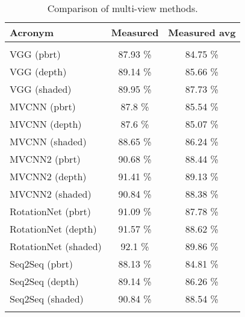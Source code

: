 \begin{table}[]
	\centering
	\begin{tabular}{lcc}
		\hline
		\textbf{Acronym}     & Measured & Measured avg \\ \hline
		                     &          &              \\ \hline
		VGG (pbrt)           & 87.93 \% &   84.75 \%   \\
		VGG (depth)          & 89.14 \% &   85.66 \%   \\
		VGG (shaded)         & 89.95 \% &   87.73 \%   \\
		MVCNN (pbrt)         & 87.8 \%  &   85.54 \%   \\
		MVCNN (depth)        & 87.6 \%  &   85.07 \%   \\
		MVCNN (shaded)       & 88.65 \% &   86.24 \%   \\
		MVCNN2 (pbrt)        & 90.68 \% &   88.44 \%   \\
		MVCNN2 (depth)       & 91.41 \% &   89.13 \%   \\
		MVCNN2 (shaded)      & 90.84 \% &   88.38 \%   \\
		RotationNet (pbrt)   & 91.09 \% &   87.78 \%   \\
		RotationNet (depth)  & 91.57 \% &   88.62 \%   \\
		RotationNet (shaded) & 92.1 \%  &   89.86 \%   \\
		Seq2Seq  (pbrt)      & 88.13 \% &   84.81 \%   \\
		Seq2Seq  (depth)     & 89.14 \% &   86.26 \%   \\
		Seq2Seq  (shaded)    & 90.84 \% &   88.54 \%   \\
		                     &          &              \\ \hline
	\end{tabular}
\caption{Comparison of multi-view methods.}
\label{Table:mv}
\end{table}